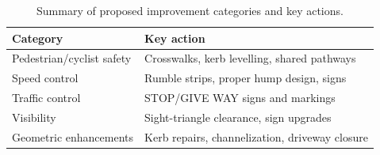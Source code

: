 \documentclass[11pt]{article}
\begin{document}
\begin{table}[H]
  \centering
  \caption{Summary of proposed improvement categories and key actions.}
  \begin{tabular}{@{}ll@{}}
    \toprule
    \textbf{Category} & \textbf{Key action} \\
    \midrule
    Pedestrian/cyclist safety & Crosswalks, kerb levelling, shared pathways \\
    Speed control             & Rumble strips, proper hump design, signs \\
    Traffic control           & STOP/GIVE WAY signs and markings \\
    Visibility                & Sight-triangle clearance, sign upgrades \\
    Geometric enhancements    & Kerb repairs, channelization, driveway closure \\
    \bottomrule
  \end{tabular}
\end{table}
\end{document}
